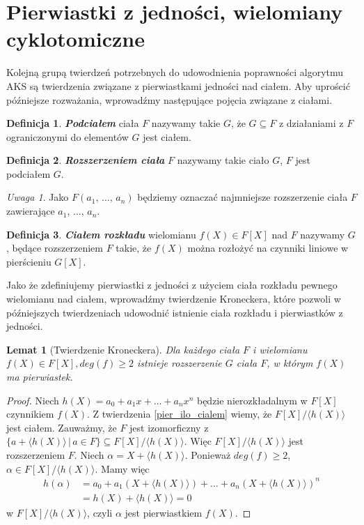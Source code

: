 \documentclass[declaration,shortabstract]{iithesis}
\theoremstyle{definition}
\newtheorem{definition}{Definicja}
\theoremstyle{remark} \newtheorem{observation}{Obserwacja}
\theoremstyle{plain} \newtheorem{theorem}{Twierdzenie}
\theoremstyle{plain} \newtheorem{lemma}{Lemat}
\theoremstyle{remark} \newtheorem*{remark*}{Uwaga}
\theoremstyle{reminder} \newtheorem*{reminder*}{Przypomnienie}
\begin{document}
\section{Pierwiastki z jedności, wielomiany cyklotomiczne}

Kolejną grupą twierdzeń potrzebnych do udowodnienia poprawności algorytmu AKS są twierdzenia związane z pierwiastkami jedności nad ciałem. Aby uprościć późniejsze rozważania, wprowadźmy następujące pojęcia związane z ciałami.

\begin{definition}
	\textit{\textbf{Podciałem}} ciała $F$ nazywamy takie $G$, że $G \subseteq F$ z działaniami z $F$ ograniczonymi do elementów $G$ jest ciałem.
\end{definition}
	
\begin{definition}
	\textit{\textbf{Rozszerzeniem ciała}} $F$ nazywamy takie ciało $G$, $F$ jest podciałem $G$.
\end{definition}
	
\begin{remark*}
	Jako $F(a_1, \, \dots,\, a_n)$ będziemy oznaczać najmniejsze rozszerzenie ciała $F$ zawierające $a_1, \, \dots,\, a_n$.
\end{remark*}
	
\begin{definition}
	\textit{\textbf{Ciałem rozkładu}} wielomianu $f(X) \in F[X]$ nad $F$ nazywamy $G$, będące rozszerzeniem $F$ takie, że $f(X)$ można rozłożyć na czynniki liniowe w pierścieniu $G[X]$.
\end{definition}

Jako że zdefiniujemy pierwiastki z jedności z użyciem ciała rozkładu pewnego wielomianu nad ciałem, wprowadźmy twierdzenie Kroneckera, które pozwoli w późniejszych twierdzeniach udowodnić istnienie ciała rozkładu i pierwiastków z jedności.
	
\begin{lemma}[Twierdzenie Kroneckera] \label{Kronecker}
	Dla każdego ciała $F$ i wielomianu $f(X) \in F[X], deg(f) \geq 2$ istnieje rozszerzenie $G$ ciała $F$, w którym $f(X)$ ma pierwiastek.
\end{lemma}
	
\begin{proof}
	Niech $h(X) = a_0 + a_1x + \dots + a_nx^n$ będzie nierozkładalnym w $F[X]$ czynnikiem $f(X)$. Z twierdzenia \ref{pier_ilo_cialem} 
	wiemy, że $F[X]/\langle h(X) \rangle$ jest ciałem. 
	Zauważmy, że $F$ jest izomorficzny z $\{a + \langle h(X) \rangle \, | \, a \in F\} \subseteq F[X]/\langle h(X) \rangle$. 
	Więc $F[X]/\langle h(X) \rangle$ jest rozszerzeniem $F$.\newline
    Niech $\alpha = X + \langle h(X)\rangle$. Ponieważ $deg(f) \geq 2$, $\alpha \in F[X]/\langle h(X) \rangle$. Mamy więc 
    \begin{align*}
        h(\alpha) &= a_0 + a_1(X + \langle h(X)\rangle) + \dots + a_n(X+\langle h(X)\rangle)^n \\
        &= h(X) + \langle h(X) \rangle = 0 
    \end{align*}
    w $F[X]/\langle h(X) \rangle$, czyli $\alpha$ jest pierwiastkiem $f(X)$.
\end{proof}
\end{document}
